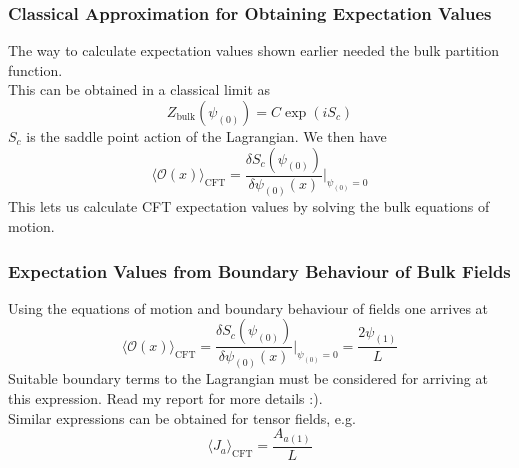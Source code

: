 \documentclass{beamer}
\renewcommand{\i}{\ensuremath{i}}
\begin{document}
\begin{frame}
\frametitle{Classical Approximation for Obtaining Expectation Values}
The way to calculate expectation values shown earlier needed the bulk partition function.\\
This can be obtained in a classical limit as
\begin{equation}
 Z_{\mathrm{bulk}}(\psi_{(0)})=C\exp(\i S_c)\label{semi}
\end{equation}
$S_c$ is the saddle point action of the Lagrangian. We then have 
\begin{equation}
\langle \mathcal{O}(x) \rangle_{\mathrm{CFT}}=\frac{\delta S_c(\psi_{(0)})}{\delta\psi_{(0)}(x)}|_{\psi_{(0)}=0}
\end{equation}
This lets us calculate CFT expectation values by solving the bulk equations of motion.
\end{frame}


\begin{frame}
\frametitle{Expectation Values from Boundary Behaviour of Bulk Fields}
Using the equations of motion and boundary behaviour of fields one arrives at
\begin{equation}
\langle \mathcal{O}(x) \rangle_{\mathrm{CFT}}=\frac{\delta S_c(\psi_{(0)})}{\delta\psi_{(0)}(x)}|_{\psi_{(0)}=0}
=\frac{2\psi_{(1)}}{L}
\end{equation}
Suitable boundary terms to the Lagrangian must be considered for arriving at this expression. Read my report for more details :).\\
Similar expressions can be obtained for tensor fields, e.g.\\
 \begin{equation}
 \langle J_a\rangle_{\mathrm{CFT}}=\frac{A_{a(1)}}{L}
\end{equation}
\end{frame}
\end{document}
